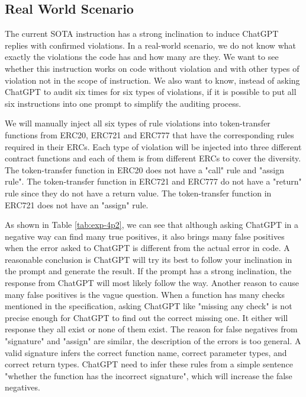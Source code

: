 \subsection{Real World Scenario}
{  \color{red}
The current SOTA instruction has a strong inclination to induce ChatGPT replies with confirmed violations. In a real-world scenario, we do not know what exactly the violations the code has and how many are they.  We want to see whether this instruction works on code without violation and with other types of violation not in the scope of instruction. We also want to know, instead of asking ChatGPT to audit six times for six types of violations, if it is possible to put all six instructions into one prompt to simplify the auditing process.

We will manually inject all six types of rule violations into token-transfer functions from ERC20, ERC721 and ERC777 that have the corresponding rules required in their ERCs. Each type of violation will be injected into three different contract functions and each of them is from different ERCs to cover the diversity. The token-transfer function in ERC20 does not have a "call" rule and "assign rule". The token-transfer function in ERC721 and ERC777 do not have a "return" rule since they do not have a return value. The token-transfer function in ERC721 does not have an "assign" rule.

As shown in Table \ref{tab:exp-4p2}, we can see that although asking ChatGPT in a negative way can find many true positives, it also brings many false positives when the error asked to ChatGPT is different from the actual error in code. A reasonable conclusion is ChatGPT will try its best to follow your inclination in the prompt and generate the result. If the prompt has a strong inclination, the response from ChatGPT will most likely follow the way. Another reason to cause many false positives is the vague question. When a function has many checks mentioned in the specification, asking ChatGPT like "missing any check" is not precise enough for ChatGPT to find out the correct missing one. It either will response 
they all exist or none of them exist. The reason for false negatives from "signature" and "assign" are similar, the description of the errors is too general. A valid signature infers the correct function name, correct parameter types, and correct return types. ChatGPT need to infer these rules from a simple sentence "whether the function has the incorrect signature", which will increase the false negatives.



}
